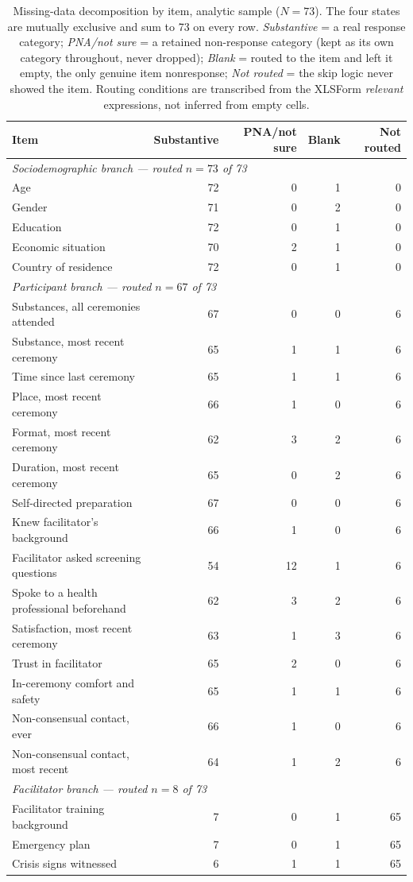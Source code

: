 \documentclass[12pt]{article}
\begin{document}
\begin{table}[htbp]
\centering
\small
\caption{Missing-data decomposition by item, analytic sample ($N=73$). The four states are mutually
exclusive and sum to 73 on every row. \emph{Substantive} = a real response category; \emph{PNA/not sure} =
a retained non-response category (kept as its own category throughout, never dropped); \emph{Blank} =
routed to the item and left it empty, the only genuine item nonresponse; \emph{Not routed} = the skip
logic never showed the item. Routing conditions are transcribed from the XLSForm \emph{relevant}
expressions, not inferred from empty cells.}
\label{tab:missingness}
\begin{tabular}{lrrrr}
\toprule
Item & Substantive & PNA/not sure & Blank & Not routed \\
\midrule
\multicolumn{5}{l}{\emph{Sociodemographic branch --- routed $n=73$ of 73}} \\
\midrule
Age & 72 & 0 & 1 & 0 \\
Gender & 71 & 0 & 2 & 0 \\
Education & 72 & 0 & 1 & 0 \\
Economic situation & 70 & 2 & 1 & 0 \\
Country of residence & 72 & 0 & 1 & 0 \\
\midrule
\multicolumn{5}{l}{\emph{Participant branch --- routed $n=67$ of 73}} \\
\midrule
Substances, all ceremonies attended & 67 & 0 & 0 & 6 \\
Substance, most recent ceremony & 65 & 1 & 1 & 6 \\
Time since last ceremony & 65 & 1 & 1 & 6 \\
Place, most recent ceremony & 66 & 1 & 0 & 6 \\
Format, most recent ceremony & 62 & 3 & 2 & 6 \\
Duration, most recent ceremony & 65 & 0 & 2 & 6 \\
Self-directed preparation & 67 & 0 & 0 & 6 \\
Knew facilitator's background & 66 & 1 & 0 & 6 \\
Facilitator asked screening questions & 54 & 12 & 1 & 6 \\
Spoke to a health professional beforehand & 62 & 3 & 2 & 6 \\
Satisfaction, most recent ceremony & 63 & 1 & 3 & 6 \\
Trust in facilitator & 65 & 2 & 0 & 6 \\
In-ceremony comfort and safety & 65 & 1 & 1 & 6 \\
Non-consensual contact, ever & 66 & 1 & 0 & 6 \\
Non-consensual contact, most recent & 64 & 1 & 2 & 6 \\
\midrule
\multicolumn{5}{l}{\emph{Facilitator branch --- routed $n=8$ of 73}} \\
\midrule
Facilitator training background & 7 & 0 & 1 & 65 \\
Emergency plan & 7 & 0 & 1 & 65 \\
Crisis signs witnessed & 6 & 1 & 1 & 65 \\
\bottomrule
\end{tabular}
\end{table}
\end{document}
